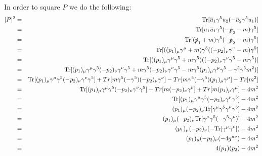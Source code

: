 \documentclass[12pt]{article}
\def \bea{\begin{eqnarray}}
\def \eea{\end{eqnarray}}
\def \Tr{{\rm Tr}}
\def \nn{\nonumber}
\def \nl{\nn \\}
\def \ou{\overline{u}}
\def \ga{\gamma}
\begin{document}
\begin{enumerate}
In order to square $P$ we do the following:
\bea
|P|^2&=& \Tr[\ou_1 \ga^5 u_2(-\ou_2 \ga^5 u_1)] \\
&=& \Tr[u_1 \ou_1 \ga^5(-\slashed{p}_2 - m) \ga^5] \\
&=& \Tr[(\slashed{p}_1+m) \ga^5 (-\slashed{p}_2-m) \ga^5] \\
&=& \Tr[((p_1)_\mu \ga^\mu+m) \ga^5 ((-p_2)_\nu\ga^\nu-m)  \ga^5] \\
&=& \Tr[((p_1)_\mu \ga^\mu\ga^5+m\ga^5) ((-p_2)_\nu\ga^\nu\ga^5-m\ga^5)] \\
&=& \Tr[(p_1)_\mu \ga^\mu\ga^5(-p_2)_\nu\ga^\nu\ga^5+ m\ga^5(-p_2)_\nu\ga^\nu\ga^5 -m\ga^5(p_1)_\mu \ga^\mu\ga^5 - \ga^5\ga^5m^2)] \nl
&=& \Tr[(p_1)_\mu \ga^\mu\ga^5(-p_2)_\nu\ga^\nu\ga^5] + Tr[ m\ga^5(-\ga^5)(-p_2)_\nu\ga^\nu] - Tr[m\ga^5(-\ga^5)(p_1)_\mu \ga^\mu] - Tr[m^2] \nl
&=& \Tr[(p_1)_\mu \ga^\mu\ga^5(-p_2)_\nu\ga^\nu\ga^5] -Tr[ m(-p_2)_\nu\ga^\nu] + Tr[m(p_1)_\mu \ga^\mu] - 4m^2 \\
&=& \Tr[(p_1)_\mu \ga^\mu\ga^5(-p_2)_\nu\ga^\nu\ga^5] - 4m^2 \\
&=& (p_1)_\mu(-p_2)_\nu \Tr[\ga^\mu\ga^5\ga^\nu\ga^5]- 4m^2 \\
&=& (p_1)_\mu(-p_2)_\nu \Tr[\ga^\mu\ga^5(-\ga^5\ga^\nu)]- 4m^2\\
&=& (p_1)_\mu(-p_2)_\nu (-\Tr[\ga^\mu\ga^\nu])- 4m^2\\
&=& (p_1)_\mu(-p_2)_\nu (-4g^{\mu\nu})- 4m^2\\
&=& 4(p_1)(p_2)- 4m^2
\eea


\end{enumerate}
\end{document}
